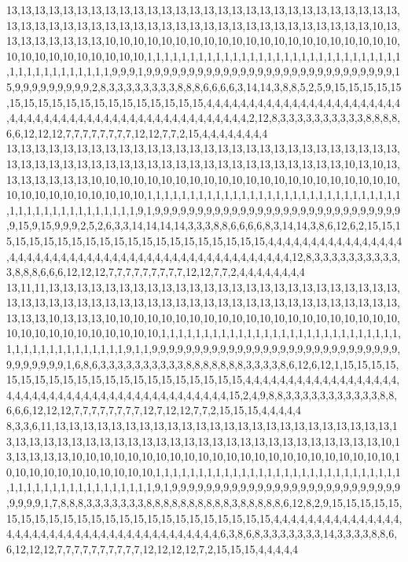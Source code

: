 13,13,13,13,13,13,13,13,13,13,13,13,13,13,13,13,13,13,13,13,13,13,13,13,13,13,13,13,13,13,13,13,13,13,13,13,13,13,13,13,13,13,13,13,13,13,13,13,13,13,13,13,13,13,10,13,13,13,13,13,13,13,13,10,10,10,10,10,10,10,10,10,10,10,10,10,10,10,10,10,10,10,10,10,10,10,10,10,10,10,10,10,10,10,1,1,1,1,1,1,1,1,1,1,1,1,1,1,1,1,1,1,1,1,1,1,1,1,1,1,1,1,1,1,1,1,1,1,1,1,1,1,1,1,1,1,9,9,9,1,9,9,9,9,9,9,9,9,9,9,9,9,9,9,9,9,9,9,9,9,9,9,9,9,9,9,9,9,9,15,9,9,9,9,9,9,9,9,9,2,8,3,3,3,3,3,3,3,3,8,8,8,6,6,6,6,3,14,14,3,8,8,5,2,5,9,15,15,15,15,15,15,15,15,15,15,15,15,15,15,15,15,15,15,15,4,4,4,4,4,4,4,4,4,4,4,4,4,4,4,4,4,4,4,4,4,4,4,4,4,4,4,4,4,4,4,4,4,4,4,4,4,4,4,4,4,4,4,4,4,4,4,4,4,4,4,2,12,8,3,3,3,3,3,3,3,3,3,3,8,8,8,8,6,6,12,12,12,7,7,7,7,7,7,7,7,12,12,7,7,2,15,4,4,4,4,4,4,4,4
13,13,13,13,13,13,13,13,13,13,13,13,13,13,13,13,13,13,13,13,13,13,13,13,13,13,13,13,13,13,13,13,13,13,13,13,13,13,13,13,13,13,13,13,13,13,13,13,13,13,13,13,10,13,10,13,13,13,13,13,13,13,10,10,10,10,10,10,10,10,10,10,10,10,10,10,10,10,10,10,10,10,10,10,10,10,10,10,10,10,10,10,10,10,1,1,1,1,1,1,1,1,1,1,1,1,1,1,1,1,1,1,1,1,1,1,1,1,1,1,1,1,1,1,1,1,1,1,1,1,1,1,1,1,1,1,1,1,1,9,1,9,9,9,9,9,9,9,9,9,9,9,9,9,9,9,9,9,9,9,9,9,9,9,9,9,9,9,9,9,9,15,9,15,9,9,9,2,5,2,6,3,3,14,14,14,14,3,3,3,8,8,6,6,6,6,8,3,14,14,3,8,6,12,6,2,15,15,15,15,15,15,15,15,15,15,15,15,15,15,15,15,15,15,15,15,15,4,4,4,4,4,4,4,4,4,4,4,4,4,4,4,4,4,4,4,4,4,4,4,4,4,4,4,4,4,4,4,4,4,4,4,4,4,4,4,4,4,4,4,4,4,4,4,4,4,12,8,3,3,3,3,3,3,3,3,3,3,3,8,8,8,6,6,6,12,12,12,7,7,7,7,7,7,7,7,7,12,12,7,7,2,4,4,4,4,4,4,4,4
13,11,11,13,13,13,13,13,13,13,13,13,13,13,13,13,13,13,13,13,13,13,13,13,13,13,13,13,13,13,13,13,13,13,13,13,13,13,13,13,13,13,13,13,13,13,13,13,13,13,13,13,13,13,13,13,13,13,13,10,13,13,13,10,10,10,10,10,10,10,10,10,10,10,10,10,10,10,10,10,10,10,10,10,10,10,10,10,10,10,10,10,10,10,10,1,1,1,1,1,1,1,1,1,1,1,1,1,1,1,1,1,1,1,1,1,1,1,1,1,1,1,1,1,1,1,1,1,1,1,1,1,1,1,1,1,1,9,1,1,9,9,9,9,9,9,9,9,9,9,9,9,9,9,9,9,9,9,9,9,9,9,9,9,9,9,9,9,9,9,9,9,9,9,9,9,1,6,8,6,3,3,3,3,3,3,3,3,3,3,8,8,8,8,8,8,8,3,3,3,3,8,6,12,6,12,1,15,15,15,15,15,15,15,15,15,15,15,15,15,15,15,15,15,15,15,15,15,4,4,4,4,4,4,4,4,4,4,4,4,4,4,4,4,4,4,4,4,4,4,4,4,4,4,4,4,4,4,4,4,4,4,4,4,4,4,4,4,4,4,4,4,15,2,4,9,8,8,3,3,3,3,3,3,3,3,3,3,3,8,8,6,6,6,12,12,12,7,7,7,7,7,7,7,7,12,7,12,12,7,7,2,15,15,15,4,4,4,4,4
8,3,3,6,11,13,13,13,13,13,13,13,13,13,13,13,13,13,13,13,13,13,13,13,13,13,13,13,13,13,13,13,13,13,13,13,13,13,13,13,13,13,13,13,13,13,13,13,13,13,13,13,13,13,13,13,10,13,13,13,13,13,10,10,10,10,10,10,10,10,10,10,10,10,10,10,10,10,10,10,10,10,10,10,10,10,10,10,10,10,10,10,10,10,10,10,1,1,1,1,1,1,1,1,1,1,1,1,1,1,1,1,1,1,1,1,1,1,1,1,1,1,1,1,1,1,1,1,1,1,1,1,1,1,1,1,1,1,1,1,1,1,9,1,9,9,9,9,9,9,9,9,9,9,9,9,9,9,9,9,9,9,9,9,9,9,9,9,9,9,9,9,9,9,9,1,7,8,8,8,3,3,3,3,3,3,3,8,8,8,8,8,8,8,8,8,8,3,8,8,8,8,8,6,12,8,2,9,15,15,15,15,15,15,15,15,15,15,15,15,15,15,15,15,15,15,15,15,15,15,15,15,4,4,4,4,4,4,4,4,4,4,4,4,4,4,4,4,4,4,4,4,4,4,4,4,4,4,4,4,4,4,4,4,4,4,4,4,4,4,4,4,6,3,8,6,8,3,3,3,3,3,3,3,14,3,3,3,3,8,8,6,6,12,12,12,7,7,7,7,7,7,7,7,7,7,12,12,12,12,7,2,15,15,15,4,4,4,4,4
